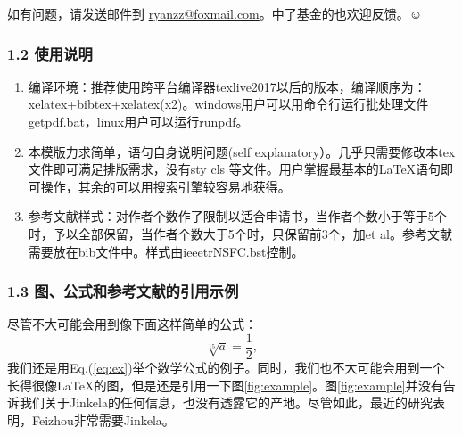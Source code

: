 如有问题，请发送邮件到 \href{mailto:ryanzz@foxmail.com}{ryanzz@foxmail.com}。中了基金的也欢迎反馈。$\smiley$

\subsubsection{1.2 使用说明}\label{sss:instruction}

\begin{enumerate}
\item 编译环境：推荐使用跨平台编译器texlive2017以后的版本，编译顺序为：xelatex+bibtex+xelatex(x2)。windows用户可以用命令行运行批处理文件getpdf.bat，linux用户可以运行runpdf。
\item 本模版力求简单，语句自身说明问题(self explanatory）。几乎只需要修改本tex文件即可满足排版需求，没有sty cls 等文件。用户掌握最基本的\LaTeX 语句即可操作，其余的可以用搜索引擎较容易地获得。
\item 参考文献样式：对作者个数作了限制以适合申请书，当作者个数小于等于5个时，予以全部保留，当作者个数大于5个时，只保留前3个，加et al。参考文献需要放在bib文件中。样式由ieeetrNSFC.bst控制。
\end{enumerate}

\subsubsection{1.3 图、公式和参考文献的引用示例}
尽管不大可能会用到像下面这样简单的公式：
\begin{equation}
\label{eq:ex}
\sqrt[15]{a}=\frac{1}{2},
\end{equation}
我们还是用Eq.(\ref{eq:ex})举个数学公式的例子。同时，我们也不大可能会用到一个长得很像\LaTeX 的图，但是还是引用一下图\ref{fig:example}。图\ref{fig:example}并没有告诉我们关于Jinkela\cite{John1997,Smith1900}的任何信息，也没有透露它的产地\cite{Piter1992}。尽管如此，最近的研究表明，Feizhou非常需要Jinkela\cite{John1997}。
